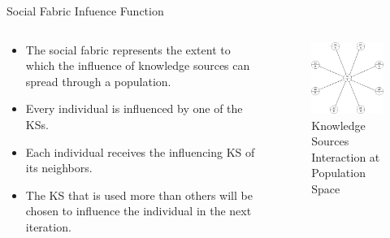 \documentclass[table]{beamer}
\begin{document}
	\begin{frame}{Social Fabric Infuence Function}
		\begin{columns}
			\begin{column}{0.6\textwidth}
				\begin{block}{}
					\begin{itemize}
						\item The social fabric represents the extent to which the influence of knowledge sources can spread through a population.
						\item Every individual is influenced by one of the KSs.
						\item Each individual receives the influencing KS of its neighbors.
						\item The KS that is used more than others will be chosen to influence the individual in the next iteration.
					\end{itemize}
				\end{block}
			\end{column}
			\begin{column}{0.4\textwidth}
				\begin{figure}[v]
					\includegraphics[scale=0.45]{votingmodel}
					\centering
					\caption{Knowledge Sources Interaction at Population Space}
					\label{ref:votingmodel}
				\end{figure}
			\end{column}
		\end{columns}
	\end{frame}
	
\end{document}
